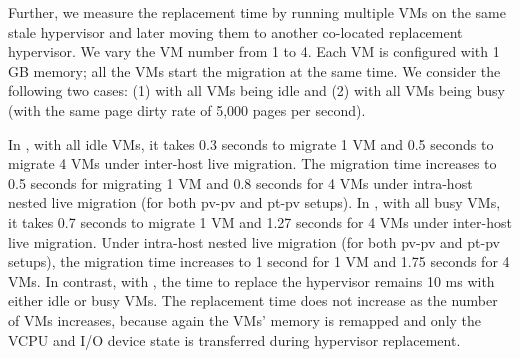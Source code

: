 


Further, we measure the replacement time
by running multiple VMs on the same stale hypervisor and later moving them to another co-located replacement hypervisor. We vary the VM number from 1 to 4. 
Each VM is configured with 1 GB memory; all the VMs start the migration at the same time. 
We consider the following two cases: (1) with all VMs being idle and (2) with all VMs being busy (with the same page dirty rate of 5,000 pages per second). 

In , with all idle VMs, it takes 0.3 seconds to migrate 1 VM and 0.5 seconds to migrate 4 VMs under inter-host live migration. The migration time increases to 0.5 seconds for migrating 1 VM and 0.8 seconds for 4 VMs under intra-host nested live migration (for both pv-pv and pt-pv setups). In , with all busy VMs, it takes 0.7 seconds to migrate 1 VM and 1.27 seconds for 4 VMs under inter-host live migration. Under intra-host nested live migration (for both pv-pv and pt-pv setups), the migration time increases to 1 second for 1 VM and 1.75 seconds for 4 VMs.
In contrast, with \arch, the time to replace the hypervisor remains 10 ms with either idle or busy VMs. The replacement time does not increase as the number of VMs increases, because again the VMs' memory is remapped and only the VCPU and I/O device state is transferred during hypervisor replacement.

